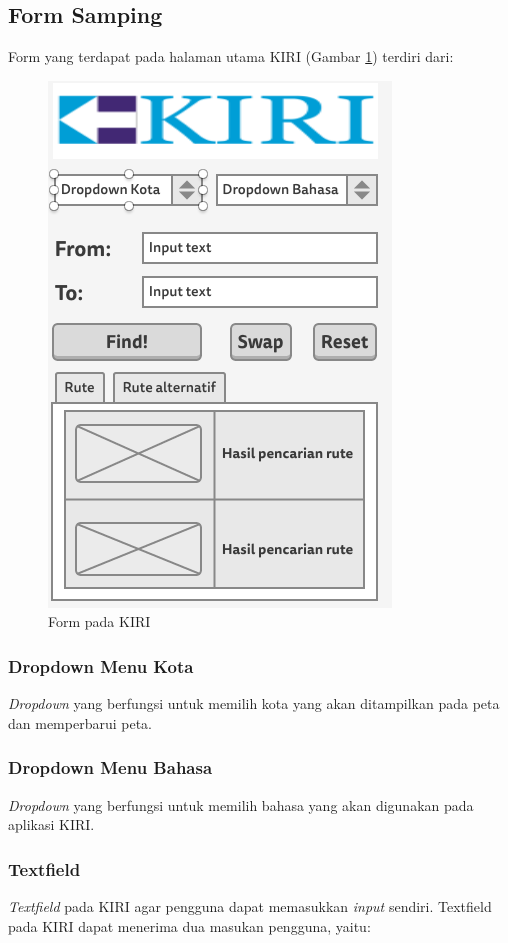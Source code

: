 \subsection{Form Samping}
Form yang terdapat pada halaman utama KIRI (Gambar \ref{fig:4_KIRI_form}) terdiri dari:
\begin{figure}[H]
	\centering
	\includegraphics[scale=0.5]{Gambar/mockup-form}
	\caption{Form pada KIRI} 
	\label{fig:4_KIRI_form}
\end{figure}

\subsubsection{Dropdown Menu Kota}
\textit{Dropdown} yang berfungsi untuk memilih kota yang akan ditampilkan pada peta dan memperbarui peta.

\subsubsection{Dropdown Menu Bahasa}
\textit{Dropdown} yang berfungsi untuk memilih bahasa yang akan digunakan pada aplikasi KIRI.


\subsubsection{Textfield}
\textit{Textfield} pada KIRI agar pengguna dapat memasukkan \textit{input} sendiri. Textfield pada KIRI dapat menerima dua masukan pengguna, yaitu:

